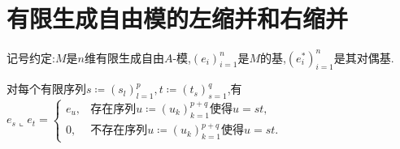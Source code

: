 \section{有限生成自由模的左缩并和右缩并}

记号约定:$M$是$n$维有限生成自由$A$-模,$\left(e_{i}\right)_{i=1}^{n}$是$M$的基,$\left(e_{i}^{\ast}\right)_{i=1}^{n}$是其对偶基.

\begin{proposition}{}{}
	对每个有限序列$s\coloneq\left(s_{l}\right)_{l=1}^{p},t\coloneq\left(t_{s}\right)_{s=1}^{q}$,有$e_{s}\llcorner e_{t}=
	\begin{cases}
		e_{u},&\text{存在序列}u\coloneq\left(u_{k}\right)_{k=1}^{p+q}\text{使得}u=st,\\
		0,&\text{不存在序列}u\coloneq\left(u_{k}\right)_{k=1}^{p+q}\text{使得}u=st.
	\end{cases}$
\end{proposition}































